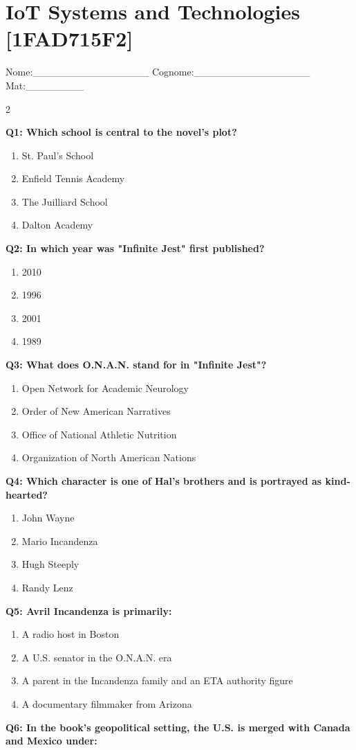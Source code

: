 \documentclass[10pt]{article}
\begin{document}
\section*{IoT Systems and Technologies \footnotesize [1FAD715F2]}
{\footnotesize Nome:\_\_\_\_\_\_\_\_\_\_\_\_\_\_\_\_ Cognome:\_\_\_\_\_\_\_\_\_\_\_\_\_\_\_\_ Mat:\_\_\_\_\_\_\_\_}
\begin{multicols}{2}

\textbf{Q1: Which school is central to the novel's plot?}

\begin{enumerate}[label=\arabic*.]
\item St. Paul's School
\item Enfield Tennis Academy
\item The Juilliard School
\item Dalton Academy
\end{enumerate}
\textbf{Q2: In which year was "Infinite Jest" first published?}

\begin{enumerate}[label=\arabic*.]
\item 2010
\item 1996
\item 2001
\item 1989
\end{enumerate}
\textbf{Q3: What does O.N.A.N. stand for in "Infinite Jest"?}

\begin{enumerate}[label=\arabic*.]
\item Open Network for Academic Neurology
\item Order of New American Narratives
\item Office of National Athletic Nutrition
\item Organization of North American Nations
\end{enumerate}
\textbf{Q4: Which character is one of Hal's brothers and is portrayed as kind-hearted?}

\begin{enumerate}[label=\arabic*.]
\item John Wayne
\item Mario Incandenza
\item Hugh Steeply
\item Randy Lenz
\end{enumerate}
\textbf{Q5: Avril Incandenza is primarily:}

\begin{enumerate}[label=\arabic*.]
\item A radio host in Boston
\item A U.S. senator in the O.N.A.N. era
\item A parent in the Incandenza family and an ETA authority figure
\item A documentary filmmaker from Arizona
\end{enumerate}
\textbf{Q6: In the book's geopolitical setting, the U.S. is merged with Canada and Mexico under:}


\end{multicols}
\end{document}
